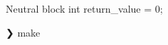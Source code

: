 \documentclass{article}
\begin{document}
\begin{codeblock}{Neutral block}
int return_value = 0;
\end{codeblock}
\begin{terminal}
❯ make
\end{terminal}
\end{document}
